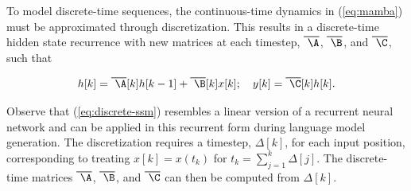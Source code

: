 To model discrete-time sequences, the continuous-time dynamics in (\ref{eq:mamba}) must be approximated through discretization. This results in a discrete-time hidden state recurrence with new matrices at each timestep, $
    \vbox{
        \hrule height 0.55pt  
        \kern0.3ex  
        \hbox{
            \kern-0.0em  
            \ifmmode\A\else\ensuremath{\A}\fi  
            \kern-0.0em  
        } } $, $
    \vbox{
        \hrule height 0.55pt  
        \kern0.3ex  
        \hbox{
            \kern-0.0em  
            \ifmmode\B\else\ensuremath{\B}\fi  
            \kern-0.0em  
        } } $, and $
    \vbox{
        \hrule height 0.55pt  
        \kern0.3ex  
        \hbox{
            \kern-0.0em  
            \ifmmode\C\else\ensuremath{\C}\fi  
            \kern-0.0em  
        } } $, such that

\begin{align}
\label{eq:discrete-ssm}
    h[k] = 
    \vbox{
        \hrule height 0.55pt  
        \kern0.3ex  
        \hbox{
            \kern-0.0em  
            \ifmmode\A\else\ensuremath{\A}\fi  
            \kern-0.0em  
        } } [k] h[k-1] + 
    \vbox{
        \hrule height 0.55pt  
        \kern0.3ex  
        \hbox{
            \kern-0.0em  
            \ifmmode\B\else\ensuremath{\B}\fi  
            \kern-0.0em  
        } } [k] x[k]; \quad y[k] = 
    \vbox{
        \hrule height 0.55pt  
        \kern0.3ex  
        \hbox{
            \kern-0.0em  
            \ifmmode\C\else\ensuremath{\C}\fi  
            \kern-0.0em  
        } } [k] h[k].
\end{align}

Observe that (\ref{eq:discrete-ssm}) resembles a linear version of a recurrent neural network and can be applied in this recurrent form during language model generation. The discretization requires a timestep, $\Delta[k]$, for each input position, corresponding to treating $x[k] = x\left(t_k\right)$ for $t_k =\sum_{j=1}^{k} \Delta[j]$. The discrete-time matrices $
    \vbox{
        \hrule height 0.55pt  
        \kern0.3ex  
        \hbox{
            \kern-0.0em  
            \ifmmode\A\else\ensuremath{\A}\fi  
            \kern-0.0em  
        } } $, $
    \vbox{
        \hrule height 0.55pt  
        \kern0.3ex  
        \hbox{
            \kern-0.0em  
            \ifmmode\B\else\ensuremath{\B}\fi  
            \kern-0.0em  
        } } $, and $
    \vbox{
        \hrule height 0.55pt  
        \kern0.3ex  
        \hbox{
            \kern-0.0em  
            \ifmmode\C\else\ensuremath{\C}\fi  
            \kern-0.0em  
        } } $ can then be computed from $\Delta[k]$.

